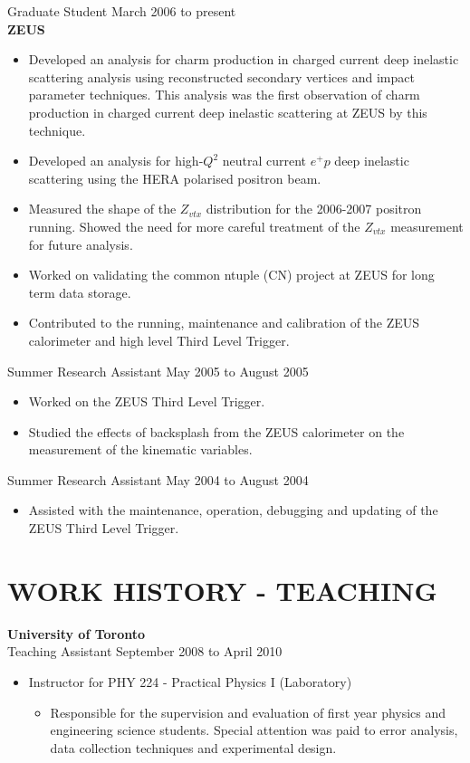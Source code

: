 \documentclass[margin]{res}
\begin{document}
\begin{resume}
Graduate Student \hfill March 2006 to present\\


\textbf{ZEUS}

\begin{itemize}
\item Developed an analysis for charm production in charged current deep inelastic scattering analysis using reconstructed secondary vertices and impact parameter techniques.  This analysis was the first observation of charm production in charged current deep inelastic scattering at ZEUS by this technique.
\item Developed an analysis for high-$Q^2$ neutral current $e^{+}p $ deep inelastic scattering using the HERA polarised positron beam. 
\item Measured the shape of the $Z_{vtx}$ distribution for the 2006-2007 positron running.  Showed the need for more careful treatment of the $Z_{vtx}$ measurement for future analysis.
\item Worked on validating the common ntuple (CN) project at ZEUS for long term data storage.
\item Contributed to the running, maintenance and calibration of the ZEUS calorimeter and high level Third Level Trigger. 
\end{itemize}

Summer Research Assistant \hfill May 2005 to August 2005\\

\begin{itemize}
  \item Worked on the ZEUS Third Level Trigger.
  \item Studied the effects of backsplash from the ZEUS calorimeter on the measurement of the kinematic variables.
\end{itemize}

Summer Research Assistant \hfill May 2004 to August 2004 \\

\begin{itemize}
\item Assisted with the maintenance, operation, debugging and updating of the ZEUS Third Level Trigger. 
\end{itemize}

\section{WORK HISTORY - TEACHING}

{\bf University of Toronto} \\
Teaching Assistant \hfill September 2008 to April 2010 
\begin{itemize}
\item Instructor for PHY 224 - Practical  Physics I (Laboratory)
  \begin{itemize}
    \item Responsible for the supervision and evaluation of first year physics and engineering science students.  Special attention was paid to error analysis, data collection techniques and experimental design.


\end{itemize}
\end{itemize}
\end{resume}
\end{document}
